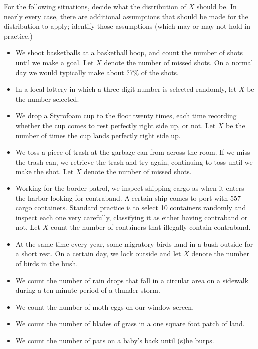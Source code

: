 \documentclass[captions=tableheading]{scrbook}
\begin{document}
\begin{xca}
For the following situations, decide what the distribution of \(X\) should be. In nearly every case, there are additional assumptions that should be made for the distribution to apply; identify those assumptions (which may or may not hold in practice.)
\begin{itemize}
\item We shoot basketballs at a basketball hoop, and count the number of shots until we make a goal. Let \(X\) denote the number of missed shots. On a normal day we would typically make about 37\% of the shots.
\item In a local lottery in which a three digit number is selected randomly, let \(X\) be the number selected.
\item We drop a Styrofoam cup to the floor twenty times, each time recording whether the cup comes to rest perfectly right side up, or not. Let \(X\) be the number of times the cup lands perfectly right side up.
\item We toss a piece of trash at the garbage can from across the room. If we miss the trash can, we retrieve the trash and try again, continuing to toss until we make the shot. Let \(X\) denote the number of missed shots.
\item Working for the border patrol, we inspect shipping cargo as when it enters the harbor looking for contraband. A certain ship comes to port with 557 cargo containers. Standard practice is to select 10 containers randomly and inspect each one very carefully, classifying it as either having contraband or not. Let \(X\) count the number of containers that illegally contain contraband.
\item At the same time every year, some migratory birds land in a bush outside for a short rest. On a certain day, we look outside and let \(X\) denote the number of birds in the bush.
\item We count the number of rain drops that fall in a circular area on a sidewalk during a ten minute period of a thunder storm.
\item We count the number of moth eggs on our window screen.
\item We count the number of blades of grass in a one square foot patch of land.
\item We count the number of pats on a baby's back until (s)he burps.
\end{itemize}

\end{xca}
\end{document}
